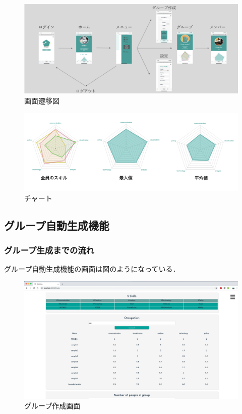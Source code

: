 \documentclass{funthesis}
\begin{document}
\begin{figure}[h]
 \centering
   \includegraphics[width=150mm]{figures/gamensenni.png}
 \caption{画面遷移図}
 \label{gamensenni}
\end{figure}

\begin{figure}[h]
 \centering
   \includegraphics[width=150mm]{figures/chart.png}
 \caption{チャート}
 \label{chart}
\end{figure}


\subsection{グループ自動生成機能}
\subsubsection{グループ生成までの流れ}
グループ自動生成機能の画面は図のようになっている．


\begin{figure}[h]
 \centering
   \includegraphics[width=150mm]{figures/groupseisei.png}
 \caption{グループ作成画面}
 \label{groupseisei}
\end{figure}
\end{document}
